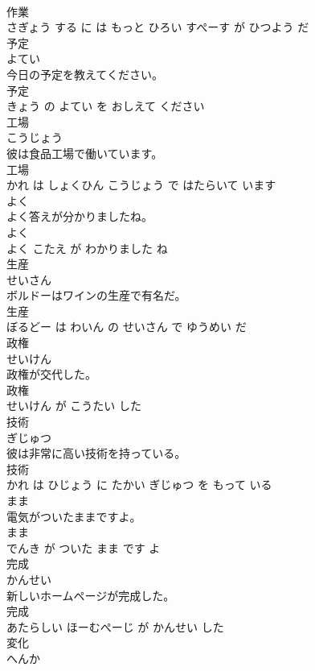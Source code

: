\documentclass[8pt]{extreport}
\begin{document}
\begin{CJK}{UTF8}{min}
\\	作業 
\\	さぎょう する に は もっと ひろい すぺーす が ひつよう だ			
\\	予定	
\\	よてい			
\\	今日の予定を教えてください。	
\\	予定 
\\	きょう の よてい を おしえて ください			
\\	工場	
\\	こうじょう			
\\	彼は食品工場で働いています。	
\\	工場 
\\	かれ は しょくひん こうじょう で はたらいて います			
\\	よく	
\\	よく答えが分かりましたね。	
\\	よく 
\\	よく こたえ が わかりました ね			
\\	生産	
\\	せいさん			
\\	ボルドーはワインの生産で有名だ。	
\\	生産 
\\	ぼるどー は わいん の せいさん で ゆうめい だ			
\\	政権	
\\	せいけん			
\\	政権が交代した。	
\\	政権 
\\	せいけん が こうたい した			
\\	技術	
\\	ぎじゅつ			
\\	彼は非常に高い技術を持っている。	
\\	技術 
\\	かれ は ひじょう に たかい ぎじゅつ を もって いる			
\\	まま	
\\	電気がついたままですよ。	
\\	まま 
\\	でんき が ついた まま です よ			
\\	完成	
\\	かんせい			
\\	新しいホームページが完成した。	
\\	完成 
\\	あたらしい ほーむぺーじ が かんせい した			
\\	変化	
\\	へんか			

\end{CJK}
\end{document}
